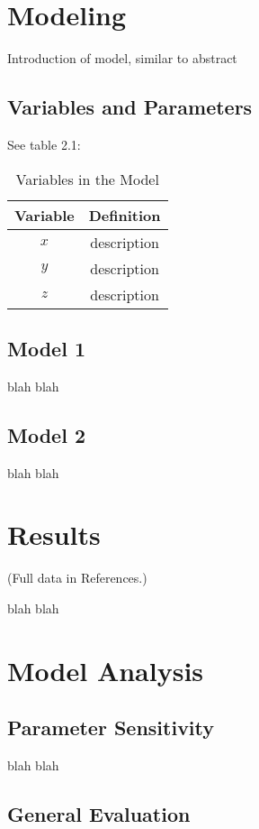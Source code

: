 \documentclass{mcm}
\numberwithin{figure}{section}
\numberwithin{table}{section}
\numberwithin{equation}{section}
\begin{document}
    \section{Modeling}
    Introduction of model, similar to abstract

    \subsection{Variables and Parameters}
    See table 2.1:
    \begin{table}[h!]
        \centering
        \begin{tabular}{cc}
            \toprule
            Variable & Definition      \\
            \midrule
            $x$      & description     \\
            $y$      & description     \\
            $z$      & description     \\
            \bottomrule
        \end{tabular}
        \caption{Variables in the Model}
        \label{tab:my_label}
    \end{table}

    \subsection{Model 1}
    blah blah

    \subsection{Model 2}
    blah blah


    \section{Results}
    \noindent (Full data in References.)

    blah blah


    \section{Model Analysis}

    \subsection{Parameter Sensitivity}
    blah blah

    \subsection{General Evaluation}
\end{document}
